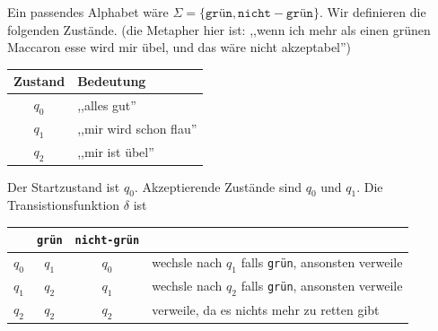 \begin{Bsp}
\begin{center}
\end{center}
Ein passendes Alphabet wäre $\Sigma = \{\mathtt{grün} , \mathtt{nicht-grün} \}$.
Wir definieren die folgenden Zustände.
(die Metapher hier ist: ,,wenn ich mehr als einen grünen Maccaron esse wird mir übel, und das wäre nicht akzeptabel'')
\begin{center}
\begin{tabular}{cl}
  Zustand & Bedeutung \\
  \hline
  $q_0$& ,,alles gut'' \\
  $q_1$& ,,mir wird schon flau'' \\
  $q_2$& ,,mir ist übel''
\end{tabular}
\end{center}
Der Startzustand ist $q_0$.
Akzeptierende Zustände sind $q_0$ und $q_1$.
Die Transistionsfunktion $\delta$ ist
\begin{center}
\begin{tabular}{cccl}
  &\texttt{grün} & \texttt{nicht-grün} \\
  \hline
  $q_0$ & $q_1$ & $q_0$ & wechsle nach $q_1$ falls \texttt{grün}, ansonsten verweile \\
  $q_1$ & $q_2$ & $q_1$ & wechsle nach $q_2$ falls \texttt{grün}, ansonsten verweile \\
  $q_2$  & $q_2$ & $q_2$ & verweile, da es nichts mehr zu retten gibt
\end{tabular}
\end{center}
\end{Bsp}


